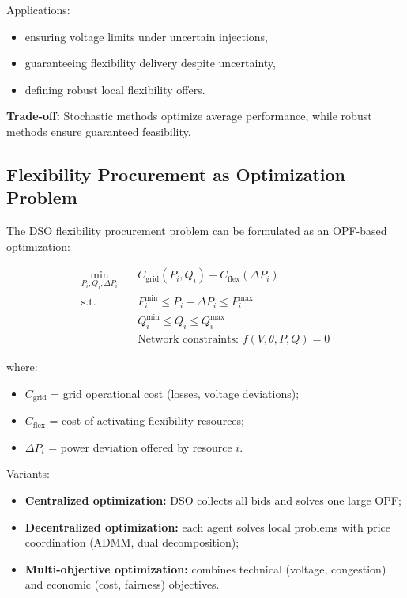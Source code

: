 \documentclass[11pt]{article}
\begin{document}
	Applications:
	\begin{itemize}
		\item ensuring voltage limits under uncertain injections,
		\item guaranteeing flexibility delivery despite uncertainty,
		\item defining robust local flexibility offers.
	\end{itemize}
	
	\textbf{Trade-off:}  
	Stochastic methods optimize average performance, while robust methods ensure guaranteed feasibility.
	
	\subsection{Flexibility Procurement as Optimization Problem}
	
	The DSO flexibility procurement problem can be formulated as an OPF-based optimization:
	
	\[
	\begin{aligned}
		\min_{P_i, Q_i, \Delta P_i} \quad & C_\text{grid}(P_i, Q_i) + C_\text{flex}(\Delta P_i) \\
		\text{s.t.} \quad & P_i^{\min} \le P_i + \Delta P_i \le P_i^{\max} \\
		& Q_i^{\min} \le Q_i \le Q_i^{\max} \\
		& \text{Network constraints: } f(V, \theta, P, Q) = 0
	\end{aligned}
	\]
	
	where:
	\begin{itemize}
		\item $C_\text{grid}$ = grid operational cost (losses, voltage deviations);
		\item $C_\text{flex}$ = cost of activating flexibility resources;
		\item $\Delta P_i$ = power deviation offered by resource $i$.
	\end{itemize}
	
	Variants:
	\begin{itemize}
		\item \textbf{Centralized optimization:} DSO collects all bids and solves one large OPF;
		\item \textbf{Decentralized optimization:} each agent solves local problems with price coordination (ADMM, dual decomposition);
		\item \textbf{Multi-objective optimization:} combines technical (voltage, congestion) and economic (cost, fairness) objectives.
	\end{itemize}
	
\end{document}
